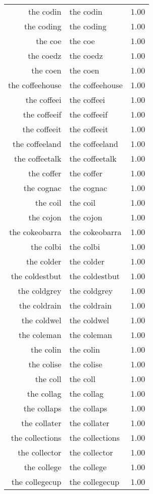 \begin{table}[ht]
\begin{tabular}{rlr}
  the codin & the codin & 1.00 \\ 
  the coding & the coding & 1.00 \\ 
  the coe & the coe & 1.00 \\ 
  the coedz & the coedz & 1.00 \\ 
  the coen & the coen & 1.00 \\ 
  the coffeehouse & the coffeehouse & 1.00 \\ 
  the coffeei & the coffeei & 1.00 \\ 
  the coffeeif & the coffeeif & 1.00 \\ 
  the coffeeit & the coffeeit & 1.00 \\ 
  the coffeeland & the coffeeland & 1.00 \\ 
  the coffeetalk & the coffeetalk & 1.00 \\ 
  the coffer & the coffer & 1.00 \\ 
  the cognac & the cognac & 1.00 \\ 
  the coil & the coil & 1.00 \\ 
  the cojon & the cojon & 1.00 \\ 
  the cokeobarra & the cokeobarra & 1.00 \\ 
  the colbi & the colbi & 1.00 \\ 
  the colder & the colder & 1.00 \\ 
  the coldestbut & the coldestbut & 1.00 \\ 
  the coldgrey & the coldgrey & 1.00 \\ 
  the coldrain & the coldrain & 1.00 \\ 
  the coldwel & the coldwel & 1.00 \\ 
  the coleman & the coleman & 1.00 \\ 
  the colin & the colin & 1.00 \\ 
  the colise & the colise & 1.00 \\ 
  the coll & the coll & 1.00 \\ 
  the collag & the collag & 1.00 \\ 
  the collaps & the collaps & 1.00 \\ 
  the collater & the collater & 1.00 \\ 
  the collections & the collections & 1.00 \\ 
  the collector & the collector & 1.00 \\ 
  the college & the college & 1.00 \\ 
  the collegecup & the collegecup & 1.00 \\ 

\end{tabular}
\end{table}
